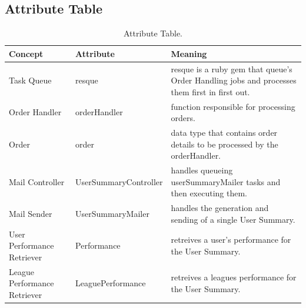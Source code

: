 \begin{table}
\subsection{Attribute Table}
\begin{tabular}{|p{1.5in}|p{1.5in}|p{3in}|}
\hline
Concept & Attribute & Meaning\\
\hline
Task Queue & resque & resque is a ruby gem that queue's Order Handling jobs and processes them first in first out.\\
\hline
Order Handler & orderHandler & function responsible for processing orders.\\
\hline
Order & order & data type that contains order details to be processed by the orderHandler.\\
\hline
Mail Controller & UserSummaryController & handles queueing userSummaryMailer tasks and then executing them.\\
\hline
Mail Sender & UserSummaryMailer & handles the generation and sending of a single User Summary.\\
\hline
User Performance Retriever & Performance & retreives a user's performance for the User Summary.\\
\hline
League Performance Retriever & LeaguePerformance & retreives a leagues performance for the User Summary.\\
\hline
\end{tabular}
\caption{ Attribute Table.}
\end{table}
